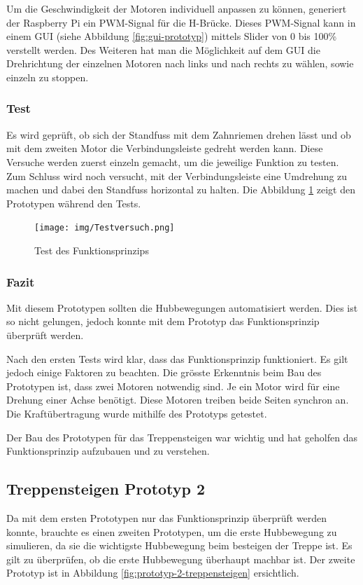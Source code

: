 \newpage

Um die Geschwindigkeit der Motoren individuell anpassen zu können, generiert der Raspberry Pi ein PWM-Signal für die H-Brücke. Dieses PWM-Signal kann in einem GUI (siehe Abbildung \ref{fig:gui-prototyp}) mittels Slider von 0 bis 100\% verstellt werden. 
Des Weiteren hat man die Möglichkeit auf dem GUI die Drehrichtung der einzelnen Motoren nach links und nach rechts zu wählen, sowie einzeln zu stoppen.

\subsubsection{Test}
Es wird geprüft, ob sich der Standfuss mit dem Zahnriemen drehen lässt und ob mit dem zweiten Motor die Verbindungsleiste gedreht werden kann. Diese Versuche werden zuerst einzeln gemacht, um die jeweilige Funktion zu testen. Zum Schluss wird noch versucht, mit der Verbindungsleiste eine Umdrehung zu machen und dabei den Standfuss horizontal zu halten. Die Abbildung \ref{fig:test-prototyp-treppensteigen} zeigt den Prototypen während den Tests.

\begin{figure}[H]
  \texttt{[image: img/Testversuch.png]}
  \centering
  \caption{Test des Funktionsprinzips}
  \label{fig:test-prototyp-treppensteigen}
\end{figure}

\subsubsection{Fazit}
Mit diesem Prototypen sollten die Hubbewegungen automatisiert werden. Dies ist so nicht gelungen, jedoch konnte mit dem Prototyp das Funktionsprinzip überprüft werden.

Nach den ersten Tests wird klar, dass das Funktionsprinzip funktioniert. Es gilt jedoch einige Faktoren zu beachten. Die grösste Erkenntnis beim Bau des Prototypen ist, dass zwei Motoren notwendig sind. Je ein Motor wird für eine Drehung einer Achse benötigt. Diese Motoren treiben beide Seiten synchron an. Die Kraftübertragung wurde mithilfe des Prototyps getestet.

Der Bau des Prototypen für das Treppensteigen war wichtig und hat geholfen das Funktionsprinzip aufzubauen und zu verstehen.

\newpage

\subsection{Treppensteigen Prototyp 2}
Da mit dem ersten Prototypen nur das Funktionsprinzip überprüft werden konnte, brauchte es einen zweiten Prototypen, um die erste Hubbewegung zu simulieren, da sie die wichtigste Hubbewegung beim besteigen der Treppe ist. Es gilt zu überprüfen, ob die erste Hubbewegung überhaupt machbar ist. Der zweite Prototyp ist in Abbildung \ref{fig:prototyp-2-treppensteigen} ersichtlich.

